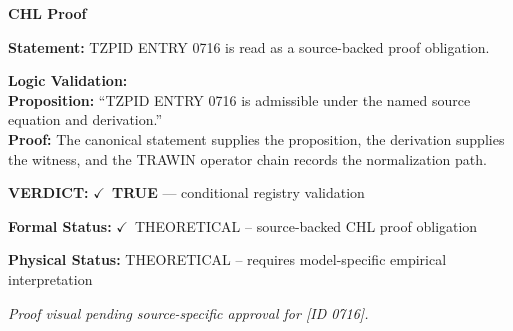 \vspace{0.45em}
\noindent\textbf{CHL Proof}\par
\textbf{Statement:} TZPID ENTRY 0716 is read as a source-backed proof obligation.

\textbf{Logic Validation:}\\
\textbf{Proposition:} ``TZPID ENTRY 0716 is admissible under the named source equation and derivation.''\\
\textbf{Proof:} The canonical statement supplies the proposition, the derivation supplies the witness, and the TRAWIN operator chain records the normalization path.

\textbf{VERDICT:} \ensuremath{\checkmark}\ \textbf{TRUE} --- conditional registry validation

\textbf{Formal Status:} \ensuremath{\checkmark}\ THEORETICAL -- source-backed CHL proof obligation

\textbf{Physical Status:} THEORETICAL -- requires model-specific empirical interpretation
\par\vspace{0.45em}
\par
\vfill
\begingroup\footnotesize\itshape
Proof visual pending source-specific approval for [ID 0716].
\par\endgroup
\vfill
\endgroup
\endgroup
